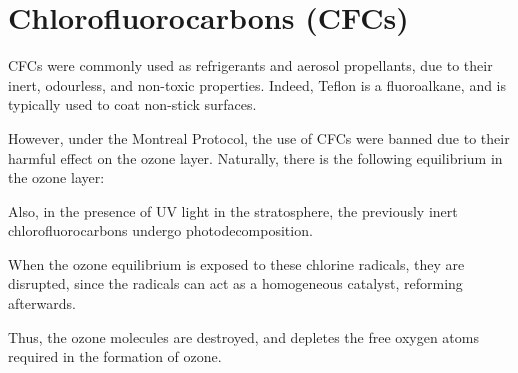 	\pagebreak
	\section{Chlorofluorocarbons (CFCs)}

		CFCs were commonly used as refrigerants and aerosol propellants, due to their inert, odourless, and non-toxic properties.
		Indeed, Teflon is a fluoroalkane, and is typically used to coat non-stick surfaces.

		However, under the Montreal Protocol, the use of CFCs were banned due to their harmful effect on the ozone layer. Naturally, there
		is the following equilibrium in the ozone layer:



		Also, in the presence of UV light in the stratosphere, the previously inert chlorofluorocarbons undergo photodecomposition.


		When the ozone equilibrium is exposed to these chlorine radicals, they are disrupted, since the radicals can act as a
		homogeneous catalyst, reforming afterwards.


		Thus, the ozone molecules are destroyed, and depletes the free oxygen atoms required in the formation of ozone.












